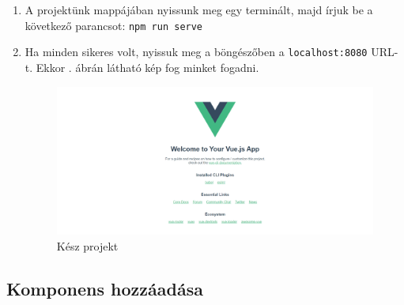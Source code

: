 \begin{enumerate}
\item A projektünk mappájában nyissunk meg egy terminált, majd írjuk be a következő parancsot: \texttt{npm run serve}
\item Ha minden sikeres volt, nyissuk meg a böngészőben a \texttt{localhost:8080} URL-t. Ekkor . ábrán látható kép fog minket fogadni.
 
\begin{figure}[h!]
\centering
\includegraphics[width=\textwidth]{images/1617370382875.png}
\caption{Kész projekt}
\label{fig:vueready}
\end{figure}

\end{enumerate}

\subsection{Komponens hozzáadása}

